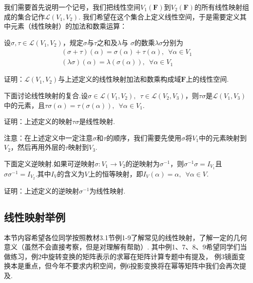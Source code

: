 我们需要首先说明一个记号，我们把线性空间$V_1(\mathbf{F})$到$V_2(\mathbf{F})$的所有线性映射组成的集合记作$\mathcal{L}(V_1,V_2)$.
我们希望在这个集合上定义线性空间，于是需要定义其中元素（线性映射）的加法和数乘运算：
\begin{definition}
    设$\sigma,\tau\in \mathcal{L}(V_1,V_2)$，规定$\sigma$与$\tau$之和及$\lambda$与
    $\sigma$的数乘$\lambda\sigma$分别为
    \begin{gather*}
        (\sigma+\tau)(\alpha)=\sigma(\alpha)+\tau(\alpha),\enspace\forall\alpha\in V_1 \\
        (\lambda\sigma)(\alpha)=\lambda(\sigma(\alpha)),\enspace\forall\alpha\in V_1
    \end{gather*}
\end{definition}
\begin{example}
    证明：$\mathcal{L}(V_1,V_2)$与上述定义的线性映射加法和数乘构成域$\mathbf{F}$上的线性空间.
\end{example}
下面讨论线性映射的复合.设$\sigma \in \mathcal{L}(V_1,V_2),\enspace\tau \in \mathcal{L}(V_2,V_3)$，则$\tau\sigma$是$\mathcal{L}(V_1,V_3)$
中的元素，且$\tau\sigma(\alpha)=\tau(\sigma(\alpha)),\enspace\forall \alpha \in V_1$.
\begin{example}
    证明：上述定义的映射$\tau\sigma$是线性映射.
\end{example}
注意：在上述定义中一定注意$\sigma$和$\tau$的顺序，我们需要先使用$\sigma$将$V_1$中的元素映射到
$V_2$，然后再用外层的$\tau$映射到$V_3$.

下面定义逆映射.如果可逆映射$\sigma:V_1 \to V_2$的逆映射为$\sigma^{-1}$，则$\sigma^{-1}\sigma=I_{V_1}$且
$\sigma\sigma^{-1}=I_{V_2}$.其中$I_{V}$的含义为$V$上的恒等映射，即$I_V(\alpha)=\alpha,\enspace \forall \alpha \in V$.
\begin{example}
    证明：上述定义的逆映射$\sigma^{-1}$为线性映射.
\end{example}
\subsection{线性映射举例}
本节内容希望各位同学按照教材3.1节例1-9了解常见的线性映射，了解一定的几何意义（虽然不会直接考察，但是对理解有帮助）.
其中例1、7、8、9希望同学们当做练习，例2中旋转变换的矩阵表示的求幂在矩阵计算专题中有提及，
例3镜面变换本是重点，但今年不要求内积空间，例6投影变换将在幂等矩阵中我们会再次提及.

